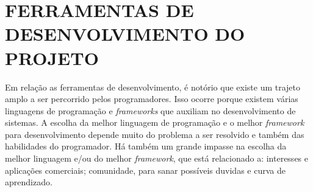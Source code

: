 \section{{FERRAMENTAS DE DESENVOLVIMENTO DO PROJETO}}

Em relação as ferramentas de desenvolvimento, é notório que existe um trajeto amplo a ser percorrido pelos programadores. Isso ocorre porque existem várias linguagens de programação e \textit{frameworks} que auxiliam no desenvolvimento de sistemas. A escolha da melhor linguagem de programação e o melhor \textit{framework} para desenvolvimento depende muito do problema a ser resolvido e também das habilidades do programador. Há também um grande impasse na escolha da melhor linguagem e/ou do melhor \textit{framework}, que está relacionado a: interesses e aplicações comerciais; comunidade, para sanar possíveis duvidas e curva de aprendizado.






%
%